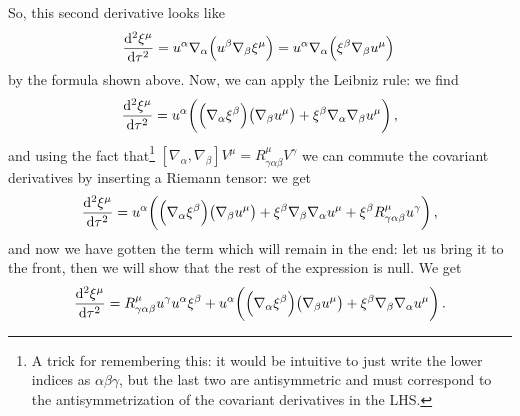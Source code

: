 \documentclass[main.tex]{subfiles}
\begin{document}
So, this second derivative looks like 
%
\begin{align}
  \dv[2]{\xi^{ \mu } }{\tau } = u^{\alpha } \nabla_{\alpha } \qty(u^{\beta } \nabla_{\beta } \xi^{\mu })
  = u^{\alpha } \nabla_{\alpha } \qty( \xi^{\beta }\nabla_{\beta } u^{\mu } )
\,
\end{align}
%
by the formula shown above. Now, we can apply the Leibniz rule: we find 
%
\begin{align}
  \dv[2]{\xi^{\mu }}{\tau } = u^{\alpha } \qty( \qty(\nabla_{\alpha } \xi^{\beta }) \qty(\nabla_{\beta } u^{\mu })  
  + \xi^{\beta } \nabla_{\alpha } \nabla_{\beta } u^{\mu } )
\,,
\end{align}
%
and using the fact that\footnote{A trick for remembering this: it would be intuitive to just write the lower indices as \(\alpha \beta \gamma \), but the last two are antisymmetric and must correspond to the antisymmetrization of the covariant derivatives in the LHS.} \([\nabla_{\alpha }, \nabla_{\beta }] V^{\mu } = R^{\mu }_{ \gamma \alpha \beta  } V^{\gamma }\) we can commute the covariant derivatives by inserting a Riemann tensor: we get 
%
\begin{align}
  \dv[2]{\xi^{\mu }}{\tau } = u^{\alpha } \qty( \qty(\nabla_{\alpha } \xi^{\beta }) \qty(\nabla_{\beta } u^{\mu })  
  + \xi^{\beta } \nabla_{\beta }\nabla_{\alpha } u^{\mu }
  + \xi^{\beta } R^{\mu }_{ \gamma \alpha \beta  } u^{\gamma } )
\,,
\end{align}
%
and now we have gotten the term which will remain in the end: let us bring it to the front, then we will show that the rest of the expression is null. We get 
%
\begin{align}
  \dv[2]{\xi^{\mu }}{\tau } =
  R^{\mu }_{ \gamma \alpha \beta  } u^{\gamma } u^{\alpha } \xi^{\beta } 
  + 
  u^{\alpha } \qty( \qty(\nabla_{\alpha } \xi^{\beta }) \qty(\nabla_{\beta } u^{\mu })  
  + \xi^{\beta } \nabla_{\beta }\nabla_{\alpha } u^{\mu } )
\,.
\end{align}
%
\end{document}
